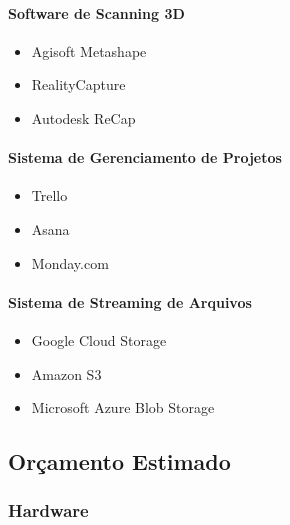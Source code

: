\paragraph{Software de Scanning 3D}
\begin{itemize}
    \item Agisoft Metashape
    \item RealityCapture
    \item Autodesk ReCap
\end{itemize}

\paragraph{Sistema de Gerenciamento de Projetos}
\begin{itemize}
    \item Trello
    \item Asana
    \item Monday.com
\end{itemize}

\paragraph{Sistema de Streaming de Arquivos}
\begin{itemize}
    \item Google Cloud Storage
    \item Amazon S3
    \item Microsoft Azure Blob Storage
\end{itemize}


\subsection{Orçamento Estimado}

\subsubsection{Hardware}

